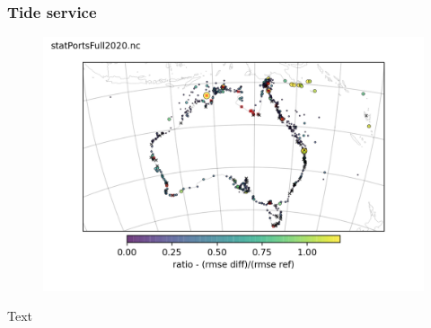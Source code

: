 \begin{frame}
\frametitle{Tide service}
\begin{minipage}{0.45\textwidth}
    \begin{figure}      
    \includegraphics[height=\textheight]{figures/maps/portsdiffRmseRatioFull.png}
    \end{figure}
\end{minipage}
\hfill
\begin{minipage}{0.45\textwidth}
    Text
\end{minipage}
\end{frame}